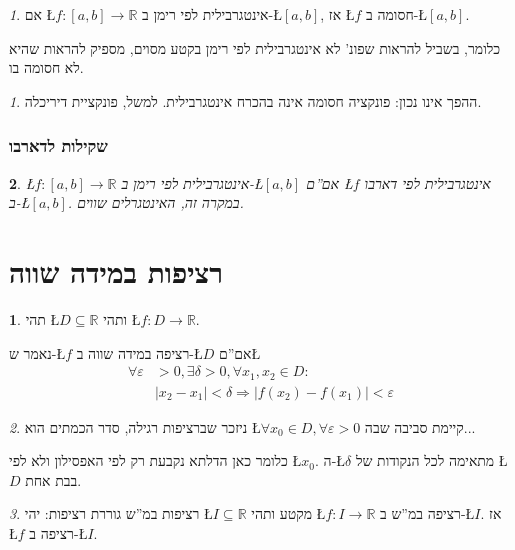 \documentclass[english,hebrew]{article}
\theoremstyle{remark}
\newtheorem*{rem*}{\protect\remarkname}
\theoremstyle{definition}
\newtheorem*{defn*}{\protect\definitionname}
\theoremstyle{plain}
\newtheorem{thm}{\protect\theoremname}
\theoremstyle{remark}
\newtheorem{claim}[thm]{\protect\claimname}
\theoremstyle{plain}
\theoremstyle{plain}
\providecommand{\claimname}{טענה}
\providecommand{\definitionname}{הגדרה}
\providecommand{\remarkname}{הערה}
\providecommand{\theoremname}{משפט}
\begin{document}
\begin{claim}
\label{claim:riemann-bounded}אם \L{$f:\left[a,b\right]\rightarrow\mathbb{R}$}
אינטגרבילית לפי רימן ב-\L{$\left[a,b\right]$}, אז \L{$f$} חסומה
ב-\L{$\left[a,b\right]$}.

כלומר, בשביל להראות שפונ' לא אינטגרבילית לפי רימן בקטע מסוים, מספיק
להראות שהיא לא חסומה בו. 
\end{claim}

\begin{rem*}
ההפך אינו נכון: פונקציה חסומה אינה בהכרח אינטגרבילית. למשל, פונקציית
דיריכלה.
\end{rem*}

\section{שקילות לדארבו}
\begin{thm}
\L{$f:\left[a,b\right]\rightarrow\mathbb{R}$} אינטגרבילית לפי רימן
ב-\L{$\left[a,b\right]$} אם\textquotedblright ם \L{$f$} אינטגרבילית
לפי דארבו ב-\L{$\left[a,b\right]$}. במקרה זה, האינטגרלים שווים. 
\end{thm}

\part{רציפות במידה שווה}
\begin{defn*}
תהי \L{$D\subseteq\mathbb{R}$} ותהי \L{$f:D\rightarrow\mathbb{R}$}.

נאמר ש-\L{$f$} רציפה במידה שווה ב-\L{$D$} אם\textquotedblright ם\L{%
\begin{align*}
\forall\varepsilon & >0,\exists\delta>0,\forall x_{1},x_{2}\in D:\\
 & \left|x_{2}-x_{1}\right|<\delta\Rightarrow\left|f\left(x_{2}\right)-f\left(x_{1}\right)\right|<\varepsilon
\end{align*}
}%
\end{defn*}
\begin{rem*}
ניזכר שברציפות רגילה, סדר הכמתים הוא \L{$\forall x_{0}\in D,\forall\varepsilon>0$}
קיימת סביבה שבה...

כלומר כאן הדלתא נקבעת רק לפי האפסילון ולא לפי \L{$x_{0}$}. ה-\L{$\delta$}
מתאימה לכל הנקודות של \L{$D$} בבת אחת.
\end{rem*}
\begin{claim}
רציפות במ\textquotedblright ש גוררת רציפות: יהי \L{$I\subseteq\mathbb{R}$}
מקטע ותהי \L{$f:I\rightarrow\mathbb{R}$} רציפה במ\textquotedblright ש
ב-\L{$I$}. אז \L{$f$} רציפה ב-\L{$I$}.
\end{claim}
\end{document}
